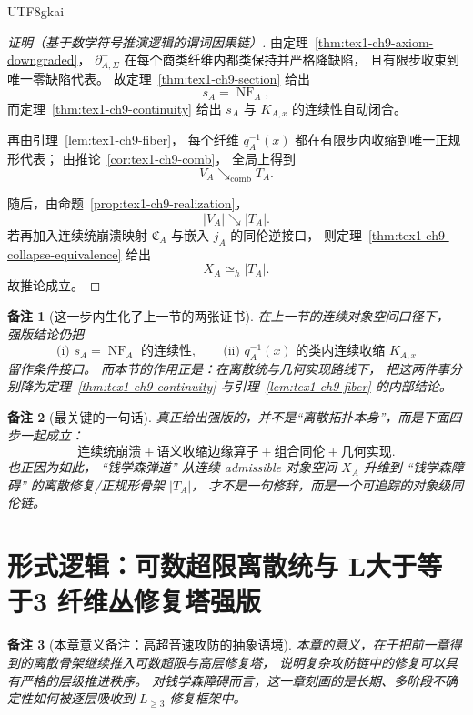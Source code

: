 \documentclass[12pt]{article}
\newtheorem{remark}{备注}[section]
\begin{document}
\begin{CJK*}{UTF8}{gkai}
\begin{proof}[证明（基于数学符号推演逻辑的谓词因果链）]
由定理~\ref{thm:tex1-ch9-axiom-downgraded}，
\(\partial^-_{A,\Sigma}\) 在每个商类纤维内都类保持并严格降缺陷，
且有限步收束到唯一零缺陷代表。
故定理~\ref{thm:tex1-ch9-section} 给出
\[
  s_A=\operatorname{NF}_A,
\]
而定理~\ref{thm:tex1-ch9-continuity} 给出 \(s_A\) 与 \(K_{A,x}\) 的连续性自动闭合。

再由引理~\ref{lem:tex1-ch9-fiber}，
每个纤维 \(q_A^{-1}(x)\) 都在有限步内收缩到唯一正规形代表；
由推论~\ref{cor:tex1-ch9-comb}，
全局上得到
\[
  V_A\searrow_{\mathrm{comb}}T_A.
\]

随后，由命题~\ref{prop:tex1-ch9-realization}，
\[
  |V_A|\searrow |T_A|.
\]
若再加入连续统崩溃映射 \(\mathfrak C_A\) 与嵌入 \(j_A\) 的同伦逆接口，
则定理~\ref{thm:tex1-ch9-collapse-equivalence} 给出
\[
  X_A\simeq_h |T_A|.
\]
故推论成立。
\end{proof}

\begin{remark}[这一步内生化了上一节的两张证书]
在上一节的连续对象空间口径下，
强版结论仍把
\[
  \text{(i) } s_A=\operatorname{NF}_A \text{ 的连续性},
  \qquad
  \text{(ii) } q_A^{-1}(x)\text{ 的类内连续收缩 }K_{A,x}
\]
留作条件接口。
而本节的作用正是：在离散统与几何实现路线下，
把这两件事分别降为定理~\ref{thm:tex1-ch9-continuity} 与引理~\ref{lem:tex1-ch9-fiber} 的内部结论。
\end{remark}

\begin{remark}[最关键的一句话]
真正给出强版的，并不是“离散拓扑本身”，而是下面四步一起成立：
\[
  \boxed{
    \text{连续统崩溃}
    +\text{语义收缩边缘算子}
    +\text{组合同伦}
    +\text{几何实现}
  }.
\]
也正因为如此，
``钱学森弹道'' 从连续 admissible 对象空间 \(X_A\) 升维到
``钱学森障碍'' 的离散修复/正规形骨架 \(|T_A|\)，
才不是一句修辞，而是一个可追踪的对象级同伦链。
\end{remark}

\clearpage
\section{形式逻辑：可数超限离散统与 L大于等于3 纤维丛修复塔强版}
\label{sec:tex1-ch10}

\begin{remark}[本章意义备注：高超音速攻防的抽象语境]
本章的意义，在于把前一章得到的离散骨架继续推入可数超限与高层修复塔，
说明复杂攻防链中的修复可以具有严格的层级推进秩序。
对钱学森障碍而言，这一章刻画的是长期、多阶段不确定性如何被逐层吸收到 \(L_{\ge 3}\) 修复框架中。
\end{remark}


\end{CJK*}
\end{document}

